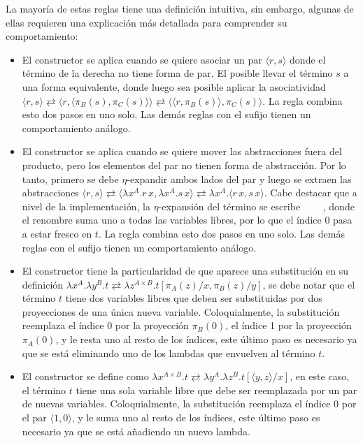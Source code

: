 La mayoría de estas reglas tiene una definición intuitiva, sin embargo, algunas de ellas requieren una explicación más detallada para comprender su comportamiento:
\begin{itemize}
	\item El constructor  se aplica cuando se quiere asociar un par $\langle r, s \rangle$ donde el término de la derecha no tiene forma de par.
	El posible llevar el término $s$ a una forma equivalente, donde luego sea posible aplicar la asociatividad $\langle r, s \rangle \rightleftarrows \langle r, \langle \pi_B(s), \pi_C(s) \rangle \rangle \rightleftarrows \langle \langle r, \pi_B(s) \rangle, \pi_C(s) \rangle$.
	La regla  combina esto dos pasos en uno solo.
	Las demás reglas con el sufijo  tienen un comportamiento análogo.
	
	\item El constructor  se aplica cuando se quiere mover las abstracciones fuera del producto, pero los elementos del par no tienen forma de abstracción.
	Por lo tanto, primero se debe $\eta$-expandir ambos lados del par y luego se extraen las abstracciones
	$\langle r, s \rangle \rightleftarrows \langle \lambda x^A.r\, x, \lambda x^A.s\, x \rangle \rightleftarrows \lambda x^A. \langle r\, x, s\, x \rangle$.
	Cabe destacar que a nivel de la implementación, la $\eta$-expansión del término  se escribe ~~~~, donde el renombre suma uno a todas las variables libres, por lo que el índice 0 pasa a estar fresco en $t$.
	La regla  combina esto dos pasos en uno solo.
	Las demás reglas con el sufijo  tienen un comportamiento análogo.
	
	\item El constructor  tiene la particularidad de que aparece una substitución en su definición $\lambda x^A. \lambda y^B. t \rightleftarrows \lambda z^{A \times B}. t[\pi_A(z)/x, \pi_B(z)/y]$, se debe notar que el término $t$ tiene dos variables libres que deben ser substituidas por dos proyecciones de una única nueva variable.
	Coloquialmente, la substitución  reemplaza el índice 0 por la proyección $\pi_B(0)$, el índice 1 por la proyección $\pi_A(0)$, y le resta uno al resto de los índices, este último paso es necesario ya que se está eliminando uno de los lambdas que envuelven al término $t$.
	
	\item El constructor  se define como $\lambda x^{A \times B}. t \rightleftarrows \lambda y^A. \lambda z^B. t[\langle y, z \rangle/x]$, en este caso, el término $t$ tiene una sola variable libre que debe ser reemplazada por un par de nuevas variables.
	Coloquialmente, la substitución  reemplaza el índice 0 por el par $\langle 1, 0 \rangle$, y le suma uno al resto de los índices, este último paso es necesario ya que se está añadiendo un nuevo lambda.
	

\end{itemize}
